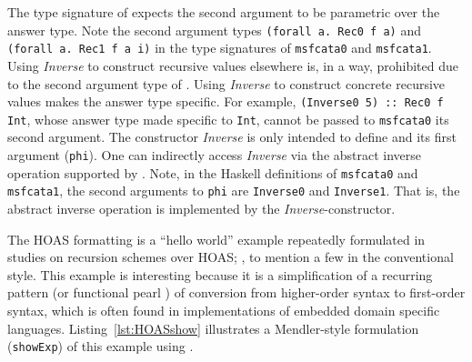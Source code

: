 The type signature of \msfit{} expects the second argument to be
parametric over the answer type. Note the second argument types
\lstinline{(forall a. Rec0 f a)} and \lstinline{(forall a. Rec1 f a i)}
in the type signatures of \lstinline{msfcata0} and \lstinline{msfcata1}. 
Using \textit{Inverse} to construct recursive values elsewhere is, in a way,
prohibited due to the second argument type of \msfit{}. Using \textit{Inverse}
to construct concrete recursive values makes the answer type specific.
For example, \lstinline{(Inverse0 5) :: Rec0 f Int}, whose answer type
made specific to \lstinline{Int}, cannot be passed to \lstinline{msfcata0}
its second argument. The constructor \textit{Inverse} is only intended to
define \msfit{} and its first argument (\lstinline{phi}). One can indirectly
access \textit{Inverse} via the abstract inverse operation supported by
\msfit{}. Note, in the Haskell definitions of \lstinline{msfcata0} and
\lstinline{msfcata1}, the second arguments to \lstinline{phi} are
\lstinline{Inverse0} and \lstinline{Inverse1}. That is, the abstract inverse
operation is implemented by the \textit{Inverse}-constructor.

\begin{figure}

\vspace*{-4ex}
\end{figure}

The HOAS formatting is a ``hello world'' example repeatedly formulated
in studies on recursion schemes over HOAS; \eg, \cite{FegShe96,bgb,BahHvi12}
to mention a few in the conventional style. This example is interesting because it
is a simplification of a recurring pattern (or functional pearl \cite{AxeCla13})
of conversion from higher-order syntax to first-order syntax, which is often
found in implementations of embedded domain specific languages.
Listing~\ref{lst:HOASshow} illustrates a Mendler-style formulation
(\lstinline{showExp}) of this example using \msfit{}.


